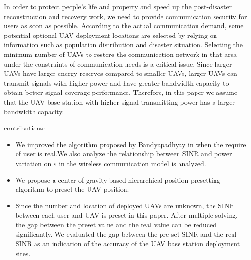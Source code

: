 \documentclass[11pt,a4paper]{article}
\begin{document}
	In order to protect people's life and property and speed up the post-disaster reconstruction and recovery work, we need to provide communication security for users as soon as possible. According to the actual communication demand, some potential optional UAV deployment locations are selected by relying on information such as population distribution and disaster situation. Selecting the minimum number of UAVs to restore the communication network in that area under the constraints of communication needs is a critical issue. Since larger UAVs have larger energy reserves compared to smaller UAVs, larger UAVs can transmit signals with higher power and have greater bandwidth capacity to obtain better signal coverage performance. Therefore, in this paper we assume that the UAV base station with higher signal transmitting power has a larger bandwidth capacity.
	
	
	
	contributions:
	\begin{itemize}
		
		\item We improved the algorithm proposed by Bandyapadhyay in \cite{bandyapadhyay_capacitated_2020} when the require of user is real.We also analyze the relationship between SINR and power variation on $\varepsilon$ in the wireless communication model is analyzed.
		
		\item We propose a center-of-gravity-based  hierarchical position presetting algorithm to preset the UAV position.
		
		\item Since the number and location of deployed UAVs are unknown, the SINR between each user and UAV is preset in this paper. After multiple solving, the gap between the preset value and the real value can be reduced significantly. We evaluated the gap between the pre-set SINR and the real SINR as an indication of the accuracy of the UAV base station deployment sites.
	\end{itemize}
\end{document}
